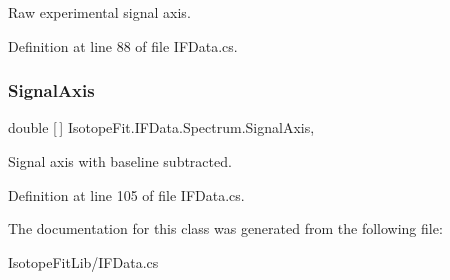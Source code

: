 Raw experimental signal axis. 



Definition at line 88 of file I\+F\+Data.\+cs.

\mbox{\label{class_isotope_fit_1_1_i_f_data_1_1_spectrum_a561e2e683aee78aed97a967a68b474e9}} 
\subsubsection{\texorpdfstring{Signal\+Axis}{SignalAxis}}
{\footnotesize\ttfamily double \mbox{[}$\,$\mbox{]} Isotope\+Fit.\+I\+F\+Data.\+Spectrum.\+Signal\+Axis\hspace{0.3cm}{\ttfamily [get]}, {\ttfamily [set]}}



Signal axis with baseline subtracted. 



Definition at line 105 of file I\+F\+Data.\+cs.



The documentation for this class was generated from the following file\+:\begin{DoxyCompactItemize}
\item 
Isotope\+Fit\+Lib/I\+F\+Data.\+cs\end{DoxyCompactItemize}
